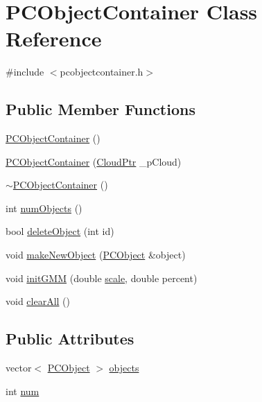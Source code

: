 \hypertarget{class_p_c_object_container}{\section{\-P\-C\-Object\-Container \-Class \-Reference}
\label{class_p_c_object_container}
}


{\ttfamily \#include $<$pcobjectcontainer.\-h$>$}

\subsection*{\-Public \-Member \-Functions}
\begin{DoxyCompactItemize}
\item 
\hyperlink{class_p_c_object_container_af21d443878f8f8c78e32db3ba7bdcd0e}{\-P\-C\-Object\-Container} ()
\item 
\hyperlink{class_p_c_object_container_a9ba8e8bca146e65e310f3acba0405617}{\-P\-C\-Object\-Container} (\hyperlink{common_8h_a36884aa4a3c181fa4c284d79329ad166}{\-Cloud\-Ptr} \-\_\-p\-Cloud)
\item 
\hyperlink{class_p_c_object_container_a62369d4a9a192b8e7266b82065362b01}{$\sim$\-P\-C\-Object\-Container} ()
\item 
int \hyperlink{class_p_c_object_container_a3028b503e5f50ee7ba14b9224cdc411d}{num\-Objects} ()
\item 
bool \hyperlink{class_p_c_object_container_a22f12c64c44f6d5881762aedad0cfb02}{delete\-Object} (int id)
\item 
void \hyperlink{class_p_c_object_container_a2d8ab397f1a69ceec7a916905565f19f}{make\-New\-Object} (\hyperlink{class_p_c_object}{\-P\-C\-Object} \&object)
\item 
void \hyperlink{class_p_c_object_container_af032c7cb3ebb37bdb515f9192f609b0e}{init\-G\-M\-M} (double \hyperlink{class_p_c_object_container_af11c2139d36c285b66b3b56ac5b3f96e}{scale}, double percent)
\item 
void \hyperlink{class_p_c_object_container_a0ef13acb954dbf3d99a743c6a1983576}{clear\-All} ()
\end{DoxyCompactItemize}
\subsection*{\-Public \-Attributes}
\begin{DoxyCompactItemize}
\item 
vector$<$ \hyperlink{class_p_c_object}{\-P\-C\-Object} $>$ \hyperlink{class_p_c_object_container_a92c4994a8b244c531bc1fb3391a9631e}{objects}
\item 
int \hyperlink{class_p_c_object_container_a59788043c1ab55a990cb05b26bf3633d}{num}
\end{DoxyCompactItemize}
